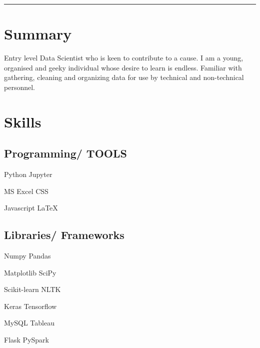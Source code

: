 \documentclass[]{plushcv}
\begin{document}
{}
\vspace{5pt}
\hrule
\vspace{10pt}

\section{Summary}
Entry level Data Scientist who is keen to contribute to a cause. I am a young, organised and geeky individual whose desire to learn is endless.
Familiar with gathering, cleaning and organizing data for use by technical and non-technical personnel.

\section{Skills}
\subsection{Programming/ TOOLS}
\vspace{\topsep}
\begin{tightemize}
\item Python  \hspace{2.52cm} \textbullet{} Jupyter
\item MS Excel \hspace{2.17cm} \textbullet{} CSS
\item Javascript \hspace{2.0cm} \textbullet{} \LaTeX
\end{tightemize}

\subsection{Libraries/ Frameworks}
\vspace{\topsep}
\begin{tightemize}
\item Numpy \hspace{2.50cm} \textbullet{} Pandas
\item Matplotlib \hspace{2.02cm} \textbullet{}   SciPy
\item Scikit-learn  \hspace{1.80cm} \textbullet{} NLTK
\item Keras \hspace{2.72cm} \textbullet{} Tensorflow
\item MySQL \hspace{2.46cm} \textbullet{}   Tableau
\item Flask \hspace{2.78cm} \textbullet{}   PySpark
\end{tightemize}
\end{document}
